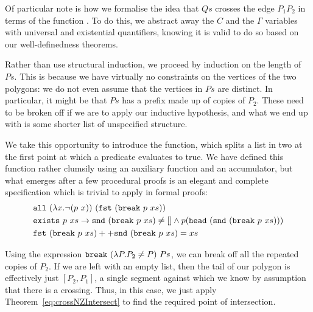 Of particular note is how we formalise the idea that $Qs$ crosses the edge $P_1P_2$ in terms of the function . To do this, we abstract away the $C$ and the $\Gamma$ variables with universal and existential quantifiers, knowing it is valid to do so based on our well-definedness theorems.

Rather than use structural induction, we proceed by induction on the length of $Ps$. This is because we have virtually no constraints on the vertices of the two polygons: we do not even assume that the vertices in $Ps$ are distinct. In particular, it might be that $Ps$ has a prefix made up of copies of $P_2$. These need to be broken off if we are to apply our inductive hypothesis, and what we end up with is some shorter list of unspecified structure.

We take this opportunity to introduce the  function, which splits a list in two at the first point at which a predicate evaluates to true. We have defined this function rather clumsily using an auxiliary function and an accumulator, but what emerges after a few procedural proofs is an elegant and complete specification which is trivial to apply in formal proofs:
\begin{align*}
&\code{all}\ (\lambda x. \neg(p\ x))\ (\code{fst}\ (\code{break}\ p\ xs))\\
&\code{exists}\ p\ xs \rightarrow \code{snd}\ (\code{break}\ p\ xs) \neq [] \wedge p (\code{head}\ (\code{snd}\ (\code{break}\ p\ xs)))\\
&\append{\code{fst}\ (\code{break}\ p\ xs)}{\code{snd}\ (\code{break}\ p\ xs)} = xs
\end{align*}

Using the expression $\code{break}\ (\lambda P. P_2 \neq P)\ Ps$, we can break off all the repeated copies of $P_2$. If we are left with an empty list, then the tail of our polygon is effectively just $[P_2,P_1]$, a single segment against which we know by assumption that there is a crossing. Thus, in this case, we just apply Theorem~\ref{eq:crossNZIntersect} to find the required point of intersection. 

